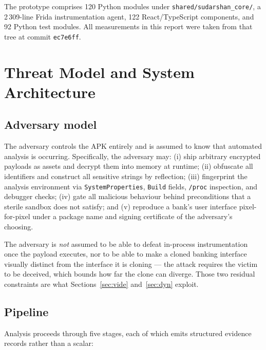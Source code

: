 \documentclass{article}
\begin{document}
The prototype comprises 120 Python modules under
\texttt{shared/sudarshan\_core/}, a 2\,309-line Frida instrumentation agent, 122
React/TypeScript components, and 92 Python test modules. All measurements in
this report were taken from that tree at commit \texttt{ec7e6ff}.

\section{Threat Model and System Architecture}
\label{sec:arch}

\subsection{Adversary model}
\label{ssec:adversary}

The adversary controls the APK entirely and is assumed to know that automated
analysis is occurring. Specifically, the adversary may: (i) ship arbitrary
encrypted payloads as assets and decrypt them into memory at runtime; (ii)
obfuscate all identifiers and construct all sensitive strings by reflection;
(iii) fingerprint the analysis environment via \texttt{SystemProperties},
\texttt{Build} fields, \texttt{/proc} inspection, and debugger checks; (iv)
gate all malicious behaviour behind preconditions that a sterile sandbox does
not satisfy; and (v) reproduce a bank's user interface pixel-for-pixel under a
package name and signing certificate of the adversary's choosing.

The adversary is \emph{not} assumed to be able to defeat in-process
instrumentation once the payload executes, nor to be able to make a cloned
banking interface visually distinct from the interface it is cloning --- the
attack requires the victim to be deceived, which bounds how far the clone can
diverge. Those two residual constraints are what Sections~\ref{sec:vide}
and~\ref{sec:dyn} exploit.

\subsection{Pipeline}
\label{ssec:pipeline}

Analysis proceeds through five stages, each of which emits structured evidence
records rather than a scalar:
\end{document}
